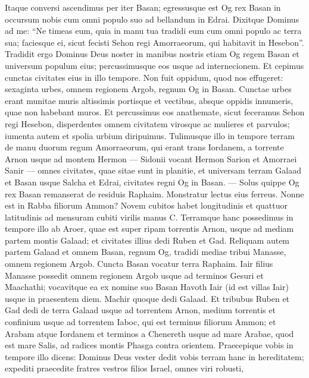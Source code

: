 \begin{biblechapter} 
\verse Itaque conversi ascendimus per iter Basan; egressusque est Og rex Basan in occursum nobis cum omni populo suo ad bellandum in Edrai. 
\verse Dixitque Dominus ad me: “Ne timeas eum, quia in manu tua tradidi eum cum omni populo ac terra sua; faciesque ei, sicut fecisti Sehon regi Amorraeorum, qui habitavit in Hesebon”. 
\verse Tradidit ergo Dominus Deus noster in manibus nostris etiam Og regem Basan et universum populum eius; percussimusque eos usque ad internecionem. 
\verse Et cepimus cunctas civitates eius in illo tempore. Non fuit oppidum, quod nos effugeret: sexaginta urbes, omnem regionem Argob, regnum Og in Basan. 
\verse Cunctae urbes erant munitae muris altissimis portisque et vectibus, absque oppidis innumeris, quae non habebant muros. 
\verse Et percussimus eos anathemate, sicut feceramus Sehon regi Hesebon, disperdentes omnem civitatem virosque ac mulieres et parvulos; 
\verse iumenta autem et spolia urbium diripuimus. 
\verse Tulimusque illo in tempore terram de manu duorum regum Amorraeorum, qui erant trans Iordanem, a torrente Arnon usque ad montem Hermon 
\verse — Sidonii vocant Hermon Sarion et Amorraei Sanir — 
\verse omnes civitates, quae sitae sunt in planitie, et universam terram Galaad et Basan usque Salcha et Edrai, civitates regni Og in Basan. 
\verse — Solus quippe Og rex Basan remanserat de residuis Raphaim. Monstratur lectus eius ferreus. Nonne est in Rabba filiorum Ammon? Novem cubitos habet longitudinis et quattuor latitudinis ad mensuram cubiti virilis manus C. 
\verse Terramque hanc possedimus in tempore illo ab Aroer, quae est super ripam torrentis Arnon, usque ad mediam partem montis Galaad; et civitates illius dedi Ruben et Gad. 
\verse Reliquam autem partem Galaad et omnem Basan, regnum Og, tradidi mediae tribui Manasse, omnem regionem Argob. Cuncta Basan vocatur terra Raphaim. 
\verse Iair filius Manasse possedit omnem regionem Argob usque ad terminos Gesuri et Maachathi; vocavitque ea ex nomine suo Basan Havoth Iair (id est villas Iair) usque in praesentem diem. 
\verse Machir quoque dedi Galaad. 
\verse Et tribubus Ruben et Gad dedi de terra Galaad usque ad torrentem Arnon, medium torrentis et confinium usque ad torrentem Iaboc, qui est terminus filiorum Ammon; 
\verse et Arabam atque Iordanem et terminos a Chenereth usque ad mare Arabae, quod est mare Salis, ad radices montis Phasga contra orientem. 
\verse Praecepique vobis in tempore illo dicens: Dominus Deus vester dedit vobis terram hanc in hereditatem; expediti praecedite fratres vestros filios Israel, omnes viri robusti, 

\end{biblechapter}
